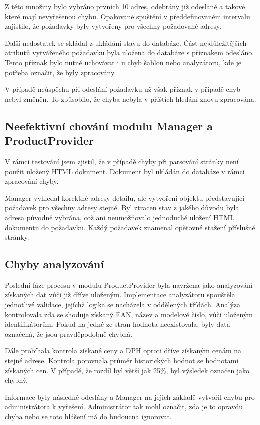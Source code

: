 \documentclass[thesis=B,czech]{FITthesis}[2012/06/26]
\begin{document}
Z této množiny bylo vybráno prvních 10 adres, odebrány již odeslané a takové které mají nevyřešenou chybu. Opakované spuštění v předdefinovaném 
intervalu zajistilo, že požadavky byly vytvořeny pro všechny požadované adresy.
\par
Další nedostatek se skládal z ukládání stavu do databáze. Část nejdůležitějších atributů vytvářeného požadavku byla uložena do databáze 
s příznakem odesláno. Tento příznak bylo nutné uchovávat i u chyb šablon nebo analyzátoru, kde je potřeba označit, že byly zpracovány. 
\par
V případě neúspěchu při odeslání požadavku už však příznak v případě chyb nebyl změněn. To způsobilo, že chyba nebyla v příštích hledání znovu zpracována.

\subsection{Neefektivní chování modulu Manager a ProductProvider}\label{ch:manager-pd}
V rámci testování jsem zjistil, že v případě chyby při parsování stránky není použit uložený HTML dokument. Dokument byl ukládán do databáze
v rámci zpracování chyby. 
\par
Manager vyhledal korektně adresy detailů, ale vytvoření objektu představující požadavek pro všechny adresy stejné. 
Byl ztracen stav z jakého důvodu byla adresa původně vybrána, což ani neumožňovalo jednoduché uložení HTML dokumentu
do požadavku. Každý požadavek znamenal opětovné stažení příslušné stránky.

\subsection{Chyby analyzování}
Poslední fáze procesu v modulu ProductProvider byla navržena jako analyzování získaných dat vůči již dříve uloženým. Implementace analyzátoru 
spouštěla jednotlivé validace, jejíchž logika se nacházela v oddělených třídách. 
Analýza kontrolovala zda se shoduje získaný EAN, název a modelové číslo, vůči uloženým identifikátorům. Pokud na jedné ze stran hodnota neexistovala, byly data označená, že jsou pravděpodobně chybná. 
\par
Dále probíhala kontrola získané ceny  a  DPH oproti dříve získaným cenám na stejné adrese. Kontrola porovnala průměr historických hodnot se hodnotami získaných cen. V případě, že rozdíl byl větší jak 25\%, byl výsledek označen jako chybný.
\par
Informace byly následně odeslány a Manager na jejich základě vytvořil chybu pro administrátora k vyřešení. Administrátor tak mohl 
označit, zda je to opravdu chyba nebo se toto hlášení má do budoucna ignorovat.
\par
\end{document}
